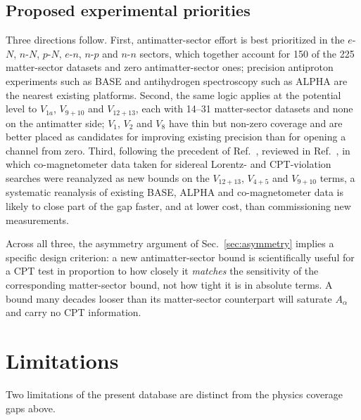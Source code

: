 \documentclass[
  aps,
  prd,
  reprint,
  amsmath,
  amssymb,
  nofootinbib,
  superscriptaddress,
  floatfix
]{revtex4-2}
\newcommand{\Aalpha}{A_\alpha}
\begin{document}
\subsection{Proposed experimental priorities}

Three directions follow. First, antimatter-sector effort is best
prioritized in the $e$-$N$, $n$-$N$, $p$-$N$, $e$-$n$, $n$-$p$ and $n$-$n$
sectors, which together account for 150 of the 225 matter-sector datasets
and zero antimatter-sector ones; precision antiproton experiments such as
BASE \cite{Smorra2017} and antihydrogen spectroscopy such as ALPHA
\cite{Ahmadi2017} are the nearest existing platforms. Second, the same
logic applies at the potential level to $V_{1a}$, $V_{9+10}$ and
$V_{12+13}$, each with 14--31 matter-sector datasets and none on the
antimatter side; $V_1$, $V_2$ and $V_8$ have thin but non-zero coverage
and are better placed as candidates for improving existing precision than
for opening a channel from zero. Third, following the precedent of
Ref.~\cite{Wu2023}, reviewed in Ref.~\cite{Cong2025}, in which
co-magnetometer data taken for sidereal Lorentz- and CPT-violation searches
were reanalyzed as new bounds on the $V_{12+13}$, $V_{4+5}$ and $V_{9+10}$
terms, a systematic reanalysis of existing BASE, ALPHA and
co-magnetometer data is likely to close part of the gap faster, and at
lower cost, than commissioning new measurements.

Across all three, the asymmetry argument of Sec.~\ref{sec:asymmetry}
implies a specific design criterion: a new antimatter-sector bound is
scientifically useful for a CPT test in proportion to how closely it
\emph{matches} the sensitivity of the corresponding matter-sector bound,
not how tight it is in absolute terms. A bound many decades looser than
its matter-sector counterpart will saturate $\Aalpha$ and carry no CPT
information.

\section{Limitations}
\label{sec:limitations}

Two limitations of the present database are distinct from the physics
coverage gaps above.
\end{document}
